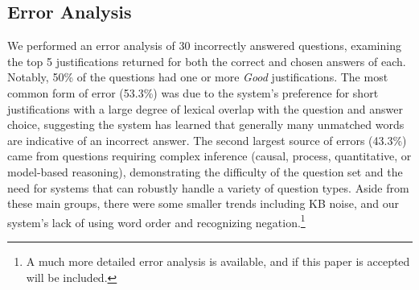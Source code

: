 \subsection{Error Analysis}
\label{sec-emnlp2017:erroranalysis}

We performed an error analysis of 30 incorrectly answered questions, %
  examining the top 5 justifications returned for both the correct and chosen answers of each.    
Notably, 50\% of the questions had one or more \emph{Good} justifications. %
The most common form of error (53.3\%) was due to the system's preference for short justifications with a large degree of lexical overlap with the question and answer choice, %
suggesting the system has learned that generally many unmatched words are indicative of an incorrect answer.  %
The second largest source of errors (43.3\%) came from questions requiring complex inference (causal, process, quantitative, or model-based reasoning), demonstrating the difficulty of the question set and the need for systems that can robustly handle a variety of question types.
Aside from these main groups, there were some smaller trends including KB noise, and our system's lack of using word order and recognizing negation.\footnote{A much more detailed error analysis is available, and if this paper is accepted will be included.}
 

